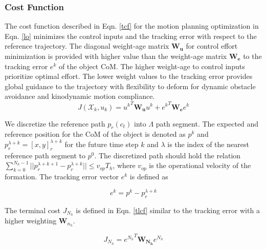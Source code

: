 \subsubsection{Cost Function} \label{lcf}
The cost function described in Eqn. \eqref{tcf} for the motion planning optimization in Eqn. \eqref{lo} minimizes the control inputs and the tracking error with respect to the reference trajectory. The diagonal weight-age matrix $\mathbf{W_u}$ for control effort minimization is provided with higher value than the weight-age matrix $\mathbf{W_e}$ to the tracking error ${e^k}$ of the object CoM. The higher weight-age to control inputs prioritize optimal effort. The lower weight values to the tracking error provides global guidance to the trajectory with flexibility to deform for dynamic obstacle avoidance and kinodynamic motion compliance.
\begin{equation}\label{tcf}
	J( \mathcal{X}_k,u_k)= {u^k}^T\mathbf{W_u}u^k + {e^k}^T\mathbf{W_e}e^k
\end{equation}

We discretize the reference path $p_r(c_t)$ into $\Lambda$ path segment.   The expected and reference position for the CoM of the object is denoted as $p^k$ and $p^{\lambda+k}_r = [x, y]^{\lambda+k}_r$ for the future time step $k$ and $\lambda$ is the index of the nearest reference path segment to $p^0$. The discretized path should hold the relation $\sum_{k= 0}^{ N_h-1}||p^{\lambda+k+1}_r - p^{\lambda+k}_r||\leq v_{op}T_h$, where $v_{op}$ is the operational velocity of the formation. The tracking error vector $e^k$ is defined as

\begin{equation}
    e^k = p^k - p^{\lambda+k}_r
\end{equation}

The terminal cost $J_{N_h}$ is defined in Eqn. \eqref{tlcf} similar to the tracking error with a higher weighting $\mathbf{W}_{n_h}$.

\begin{equation}\label{tlcf}
    J_{N_h}={e^{N_h}}^T\mathbf{W_{N_h}}e^{N_h}
\end{equation}

